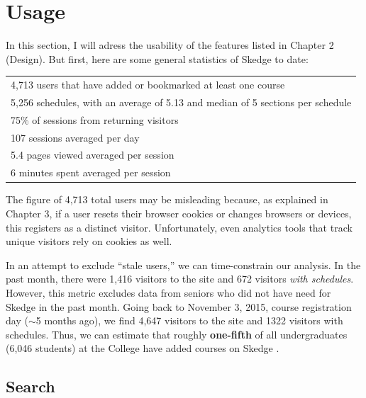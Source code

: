 
\section{Usage}

In this section, I will adress the usability of the features listed in Chapter 2 (Design). But first, here are some general statistics of Skedge to date:

\vspace{7pt}

\onehalfspacing
\begin{center}
\begin{tabular}{l}
  \hline
  4,713 users that have added or bookmarked at least one course \\ 
  5,256 schedules, with an average of 5.13 and median of 5 sections per schedule \\ 
  75\% of sessions from returning visitors \\ 
  107 sessions averaged per day \\ 
  5.4 pages viewed averaged per session  \\ 
  6 minutes spent averaged per session \\ 
  \hline
\end{tabular}
\end{center}
\doublespacing

\noindent The figure of 4,713 total users may be misleading because, as explained in Chapter 3, if a user resets their browser cookies or changes browsers or devices, this registers as a distinct visitor. Unfortunately, even analytics tools that track unique visitors rely on cookies as well.

In an attempt to exclude ``stale users,'' we can time-constrain our analysis. In the past month, there were 1,416 visitors to the site and 672 visitors \emph{with schedules}. However, this metric excludes data from seniors who did not have need for Skedge in the past month. Going back to November 3, 2015, course registration day ($\sim$5 months ago), we find 4,647 visitors to the site and 1322 visitors with schedules. Thus, we can estimate that roughly \textbf{one-fifth} of all undergraduates (6,046 students) at the College have added courses on Skedge \cite{undergrads}.

\subsection{Search}

